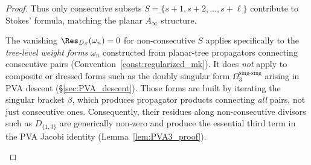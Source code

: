 \begin{proof}
Thus only consecutive subsets $S = \{s{+}1, s{+}2, \ldots, s{+}\ell\}$ contribute to Stokes' formula, matching the planar $A_\infty$ structure.

\begin{remark}
\label{rem:non-consecutive-scope}
The vanishing $\Res_{D_S}(\omega_n) = 0$ for non-consecutive $S$ applies specifically to the \emph{tree-level weight forms} $\omega_n$ constructed from planar-tree propagators connecting consecutive pairs (Convention~\ref{const:regularized_mk}). It does \emph{not} apply to composite or dressed forms such as the doubly singular form $\Omega_3^{\mathrm{sing}\text{-}\mathrm{sing}}$ arising in PVA descent (\S\ref{sec:PVA_descent}). Those forms are built by iterating the singular bracket $\beta$, which produces propagator products connecting \emph{all} pairs, not just consecutive ones. Consequently, their residues along non-consecutive divisors such as $D_{\{1,3\}}$ are generically non-zero and produce the essential third term in the PVA Jacobi identity (Lemma~\ref{lem:PVA3_proof}).
\end{remark}


\end{proof}
